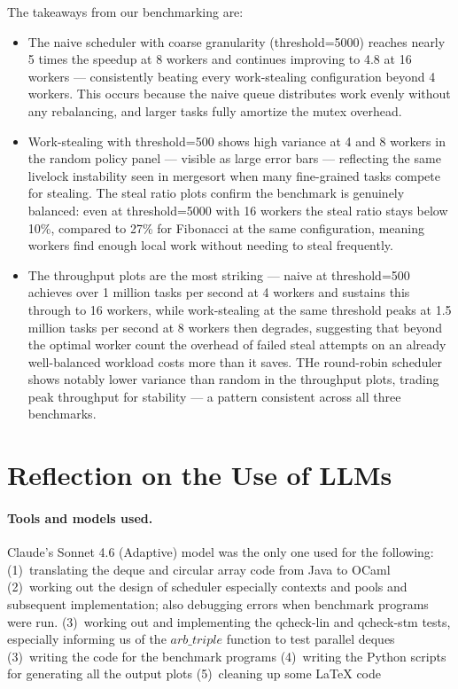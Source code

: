 \documentclass[11pt,a4paper]{article}
\begin{document}
The takeaways from our benchmarking are:
\begin{itemize}
    \item The naive scheduler with coarse granularity (threshold=5000) reaches
        nearly 5 times the speedup at 8 workers and continues improving to 4.8
        at 16 workers — consistently beating every work-stealing configuration
        beyond 4 workers. This occurs because the naive queue distributes work evenly
        without any rebalancing, and larger tasks fully amortize the mutex overhead.
    \item Work-stealing with threshold=500 shows high variance at 4 and 8 workers
        in the random policy panel — visible as large error bars — reflecting the
        same livelock instability seen in mergesort when many fine-grained tasks
        compete for stealing. The steal ratio plots confirm the benchmark is
        genuinely balanced: even at threshold=5000 with 16 workers the steal
        ratio stays below 10\%, compared to 27\% for Fibonacci at the same
        configuration, meaning workers find enough local work without needing to steal frequently.
     \item The throughput plots are the most striking — naive at threshold=500
         achieves over 1 million tasks per second at 4 workers and sustains this
         through to 16 workers, while work-stealing at the same threshold peaks
         at 1.5 million tasks per second at 8 workers then degrades, suggesting
         that beyond the optimal worker count
         the overhead of failed steal attempts on an already well-balanced workload
         costs more than it saves. THe round-robin scheduler shows notably
         lower variance than random in the throughput plots,
         trading peak throughput for stability — a pattern consistent across all
         three benchmarks.
 \end{itemize}

\section{Reflection on the Use of LLMs}
\label{sec:llm}

\paragraph{Tools and models used.}
Claude's Sonnet 4.6 (Adaptive) model was the only one used for the following:
     (1)~translating the deque and circular array code from Java to OCaml
     (2)~working out the design of scheduler especially contexts and pools and
     subsequent implementation; also debugging errors when benchmark programs were run.
     (3)~working out and implementing the qcheck-lin and qcheck-stm tests,
     especially informing us of the $arb\_triple$ function to test parallel deques
     (3)~writing the code for the benchmark programs
     (4)~writing the Python scripts for generating all the output plots
     (5)~cleaning up some LaTeX code
\end{document}
